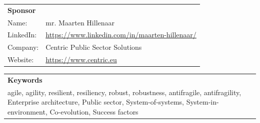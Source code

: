 \vspace{\baselineskip}

	\begin{tabular}{p{}p{}}
		\textbf{Sponsor} & \\
		Name: & mr. Maarten Hillenaar \\
		LinkedIn:	&	\url{https://www.linkedin.com/in/maarten-hillenaar/}\\
		Company:	&	Centric Public Sector Solutions\\
		Website:	&	\url{https://www.centric.eu}
	\end{tabular}

\vspace{\baselineskip}

	\begin{tabular}{p{}}
		\textbf{Keywords} \\
		\Gls{agile}, \Gls{agility}, \Gls{resilient}, \Gls{resiliency}, \Gls{robust}, \Gls{robustness}, \Gls{antifragile}, \Gls{antifragility}, Enterprise architecture, Public sector, System-of-systems, System-in-environment, Co-evolution, Success factors\\%
	\end{tabular}
